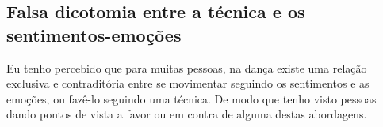 

\subsection{Falsa dicotomia entre a técnica e os sentimentos-emoções}
Eu tenho percebido que para muitas pessoas, na dança existe uma relação exclusiva e contraditória 
entre se movimentar seguindo os sentimentos e as emoções,
ou fazê-lo seguindo uma técnica. 
De modo que tenho visto pessoas dando pontos de vista a favor ou em contra de alguma destas abordagens.

